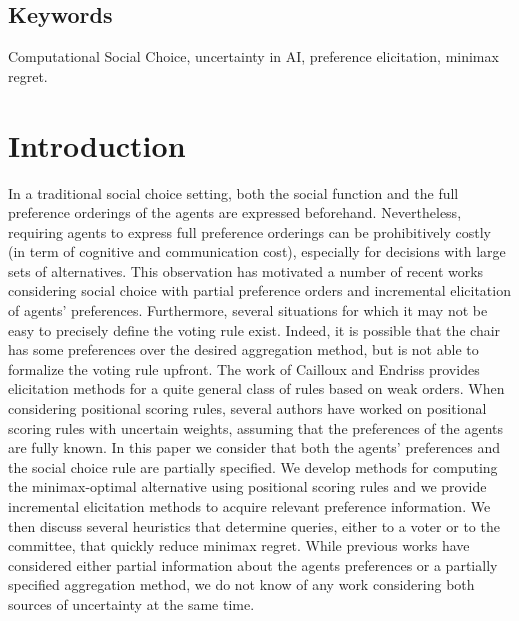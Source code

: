 \documentclass[a4paper,twoside]{article}
\begin{document}
\subsection*{Keywords}
Computational Social Choice, uncertainty in AI, preference elicitation, minimax regret.

\section{Introduction}
In a traditional social choice setting, both the social function and the full preference orderings of the agents are expressed beforehand. Nevertheless, requiring agents to express full preference orderings can be prohibitively costly (in term of cognitive and communication cost), especially for decisions with large sets of alternatives.
This observation has motivated a number of recent works considering social choice with partial preference orders \citep{Xia2008, Pini2009, Konczak05} and incremental elicitation \citep{Kalech2011, Lu2011, Naamani-Dery2015} of agents’ preferences. 
Furthermore, several situations for which it may not be easy to precisely define the voting rule exist.
Indeed, it is possible that the chair has some preferences over the desired aggregation method, but is not able to formalize the voting rule upfront.
The work of Cailloux and Endriss \citep{Cailloux2014} provides elicitation methods for a quite general class of rules based on weak orders.
When considering positional scoring rules, several authors \citep{Stein1994, Llamazares2013, Viappiani2018} have worked on positional scoring rules with uncertain weights, assuming that the preferences of the agents are fully known.
In this paper we consider that both the agents’ preferences and the social choice rule are partially specified.
We develop methods for computing the minimax-optimal alternative using positional scoring rules and we provide incremental elicitation methods to acquire relevant preference information. We then discuss several heuristics that determine queries, either to a voter or to the committee, that quickly reduce minimax regret.
While previous works have considered either partial information about the agents preferences or a partially specified aggregation method, we do not know of any work considering both sources of uncertainty at the same time.
\end{document}
